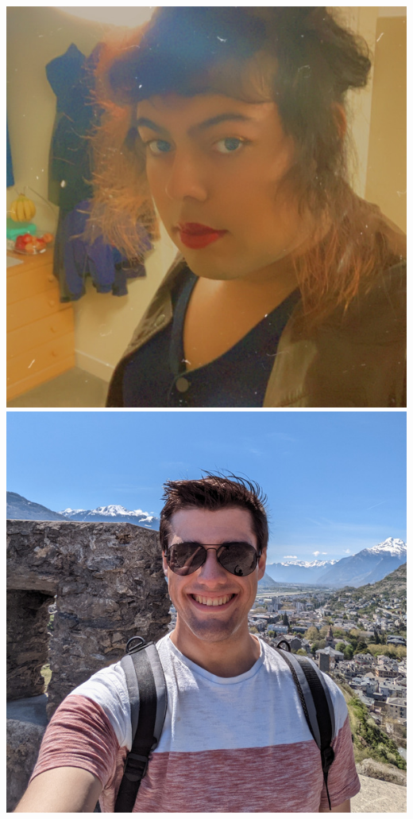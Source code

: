 \documentclass[aspectratio=169]{beamer}
\begin{document}
\begin{frame}
{        \includegraphics[width=0.09\textheight]{figures/students/felicity_ibrahim.jpg}%
        \includegraphics[width=0.09\textheight]{figures/students/george_carter.jpg}%
}
\end{frame}
\end{document}
